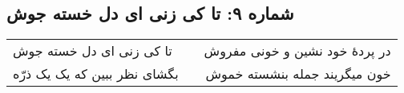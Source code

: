 \begin{center}
\section*{شماره ۹: تا کی زنی ای دل خسته جوش}
\label{sec:009}
\begin{longtable}{l p{0.5cm} r}
تا کی زنی ای دل خسته جوش
&&
در پردهٔ خود نشین و خونی مفروش
\\
بگشای نظر ببین که یک یک ذرّه
&&
خون میگریند جمله بنشسته خموش
\\
\end{longtable}
\end{center}
